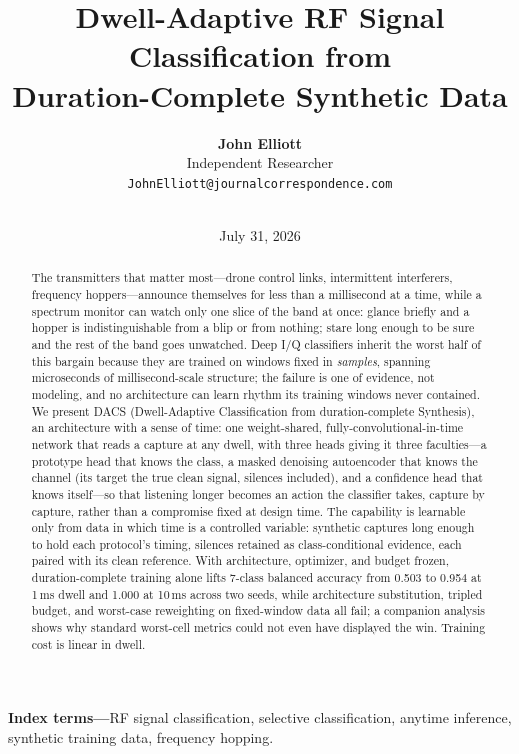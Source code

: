 \documentclass[10pt,twocolumn]{article}
\title{\vspace{-4mm}\textbf{Dwell-Adaptive RF Signal Classification from\\Duration-Complete Synthetic Data}}
\author{\textbf{John Elliott}\\[1pt]\small Independent Researcher\\[0pt]\footnotesize\texttt{JohnElliott@journalcorrespondence.com}\\[4pt]\rule{0.72\textwidth}{0.4pt}}
\date{\vspace{-3mm}\small July 31, 2026}
\newcommand{\method}{DACS}
\begin{document}
\maketitle

\begin{abstract}
The transmitters that matter most---drone control links, intermittent
interferers, frequency hoppers---announce themselves for less than a
millisecond at a time, while a spectrum monitor can watch only one slice of
the band at once: glance briefly and a hopper is indistinguishable from a
blip or from nothing; stare long enough to be sure and the rest of the band
goes unwatched. Deep I/Q classifiers inherit the worst half of this bargain
because they are trained on windows fixed in \emph{samples}, spanning
microseconds of millisecond-scale structure; the failure is one of evidence,
not modeling, and no architecture can learn rhythm its training windows never
contained. We present \method{} (Dwell-Adaptive Classification from
duration-complete Synthesis), an architecture with a sense of
time: one weight-shared, fully-convolutional-in-time network that reads a
capture at any dwell, with three heads giving it three faculties---a
prototype head that knows the class, a masked denoising autoencoder that
knows the channel (its target the true clean signal, silences included),
and a confidence head that knows itself---so that listening longer becomes
an action the classifier takes, capture by capture, rather than a
compromise fixed at design time. The capability is learnable only from
data in which time is a controlled variable: synthetic captures long
enough to hold each protocol's timing, silences retained as
class-conditional evidence, each paired with its clean reference.
With architecture, optimizer, and budget frozen, duration-complete training
alone lifts 7-class balanced accuracy from 0.503 to 0.954 at 1\,ms dwell and
1.000 at 10\,ms across two seeds, while architecture substitution, tripled
budget, and worst-case reweighting on fixed-window data all fail; a
companion analysis shows why standard worst-cell metrics could not even have
displayed the win. Training cost is linear in dwell.
\end{abstract}

{\small\noindent\textbf{Index terms---}RF signal classification, selective
classification, anytime inference, synthetic training data, frequency
hopping.\par}\vspace{4pt}
\end{document}
